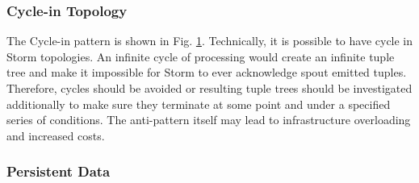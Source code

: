 \begin{figure}
\centering 
{}\label{fig:multi-anchoring}
\hspace{1cm}
\label{fig:cycle}
\end{figure}


\subsubsection{Cycle-in Topology}

The Cycle-in pattern is shown in Fig. \ref{fig:cycle}. Technically, it is possible to have cycle in Storm topologies. An infinite cycle of processing would create an infinite tuple tree and make it impossible for Storm to ever acknowledge spout emitted tuples. Therefore, cycles should be avoided or resulting tuple trees should be investigated additionally to make sure they terminate at some point and under a specified series of conditions. The anti-pattern itself may lead to infrastructure overloading and increased costs.


\subsubsection{Persistent Data}

